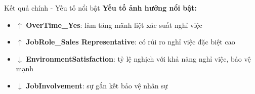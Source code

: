 \begin{frame}{Kết quả chính - Yếu tố nổi bật}
  \textbf{Yếu tố ảnh hưởng nổi bật:}
  
  \vspace{0.3cm}
  \begin{itemize}
    \item \textcolor{mainred}{$\uparrow$ \textbf{OverTime\_Yes}}: làm tăng mãnh liệt xác suất nghỉ việc
    \item \textcolor{mainred}{$\uparrow$ \textbf{JobRole\_Sales Representative}}: có rủi ro nghỉ việc đặc biệt cao
    \item \textcolor{maingreen}{$\downarrow$ \textbf{EnvironmentSatisfaction}}: tỷ lệ nghịch với khả năng nghỉ việc, bảo vệ mạnh
    \item \textcolor{maingreen}{$\downarrow$ \textbf{JobInvolvement}}: sự gắn kết bảo vệ nhân sự
  \end{itemize}
\end{frame}
